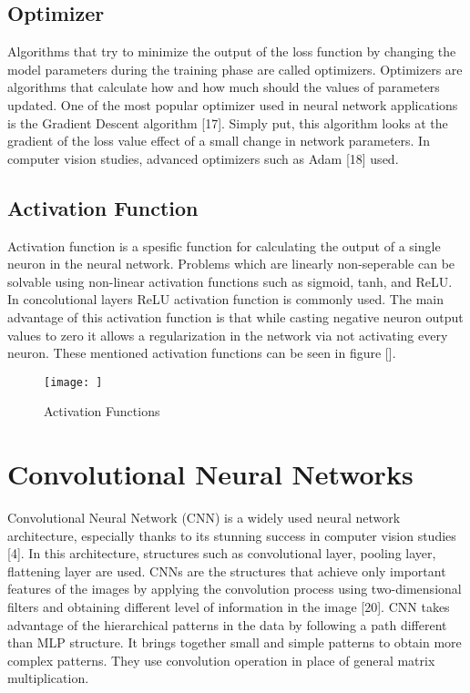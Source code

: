 \subsection{Optimizer}

Algorithms that try to minimize the output of the loss function by changing the model parameters during the training phase are called optimizers. Optimizers are algorithms that calculate how and how much should the values of parameters updated. One of the most popular optimizer used in neural network applications is the Gradient Descent algorithm [17]. Simply put, this algorithm looks at the gradient of the loss value effect of a small change in network parameters. In computer vision studies, advanced optimizers such as Adam [18] used.

\subsection{Activation Function}

Activation function is a spesific function for calculating the output of a single neuron in the neural network. Problems which are linearly non-seperable can be solvable using non-linear activation functions such as sigmoid, tanh, and ReLU. In concolutional layers ReLU activation function is commonly used. The main advantage of this activation function is that while casting negative neuron output values to zero it allows a regularization in the network via not activating every neuron. These mentioned activation functions can be seen in figure [].

\begin{figure}[h]
    \centering
    \texttt{[image: ]}
    \caption{Activation Functions}
    \label{fig:my_label}
\end{figure}

\section{Convolutional Neural Networks}

Convolutional Neural Network (CNN) is a widely used neural network architecture, especially thanks to its stunning success in computer vision studies [4]. In this architecture, structures such as convolutional layer, pooling layer, flattening layer are used. CNNs are the structures that achieve only important features of the images by applying the convolution process using two-dimensional filters and obtaining different level of information in the image [20]. CNN takes advantage of the hierarchical patterns in the data by following a path different than MLP structure. It brings together small and simple patterns to obtain more complex patterns. They use convolution operation in place of general matrix multiplication.

